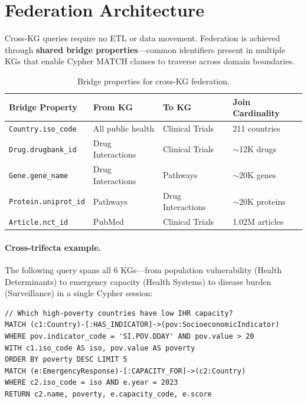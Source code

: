 \documentclass[11pt]{article}
\begin{document}
\section{Federation Architecture}
\label{sec:federation}

Cross-KG queries require no ETL or data movement. Federation is achieved through \textbf{shared bridge properties}---common identifiers present in multiple KGs that enable Cypher MATCH clauses to traverse across domain boundaries.

\begin{table}[H]
  \centering
  \caption{Bridge properties for cross-KG federation.}
  \label{tab:bridges}
  \begin{tabular}{@{}llll@{}}
    \toprule
    \textbf{Bridge Property} & \textbf{From KG} & \textbf{To KG} & \textbf{Join Cardinality} \\
    \midrule
    \texttt{Country.iso\_code} & All public health & Clinical Trials & 211 countries \\
    \texttt{Drug.drugbank\_id} & Drug Interactions & Clinical Trials & ${\sim}$12K drugs \\
    \texttt{Gene.gene\_name}   & Drug Interactions & Pathways         & ${\sim}$20K genes \\
    \texttt{Protein.uniprot\_id} & Pathways        & Drug Interactions & ${\sim}$20K proteins \\
    \texttt{Article.nct\_id}   & PubMed           & Clinical Trials   & 1.02M articles \\
    \bottomrule
  \end{tabular}
\end{table}

\paragraph{Cross-trifecta example.} The following query spans all 6 KGs---from population vulnerability (Health Determinants) to emergency capacity (Health Systems) to disease burden (Surveillance) in a single Cypher session:

\begin{lstlisting}
// Which high-poverty countries have low IHR capacity?
MATCH (c1:Country)-[:HAS_INDICATOR]->(pov:SocioeconomicIndicator)
WHERE pov.indicator_code = 'SI.POV.DDAY' AND pov.value > 20
WITH c1.iso_code AS iso, pov.value AS poverty
ORDER BY poverty DESC LIMIT 5
MATCH (e:EmergencyResponse)-[:CAPACITY_FOR]->(c2:Country)
WHERE c2.iso_code = iso AND e.year = 2023
RETURN c2.name, poverty, e.capacity_code, e.score
\end{lstlisting}
\end{document}
